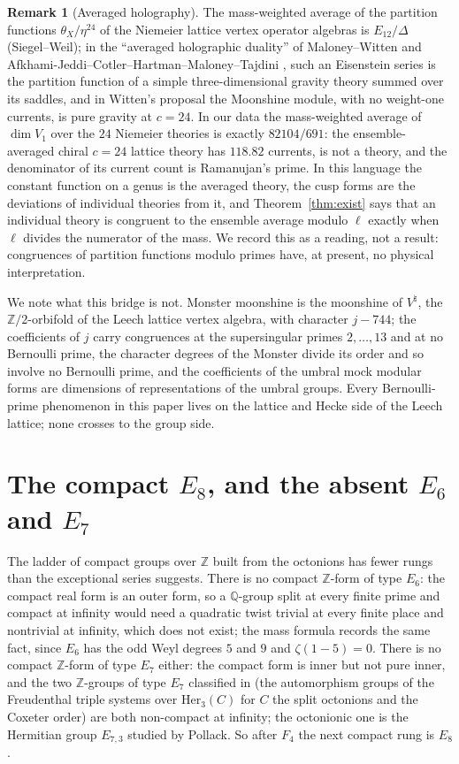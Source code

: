 \documentclass[11pt]{amsart}
\theoremstyle{definition}
\newtheorem{remark}[theorem]{Remark}
\newcommand{\Z}{\mathbb{Z}}\newcommand{\Q}{\mathbb{Q}}\newcommand{\R}{\mathbb{R}}\newcommand{\A}{\mathbb{A}}\newcommand{\F}{\mathbb{F}}
\begin{document}
\begin{remark}[Averaged holography]
The mass-weighted average of the partition functions $\theta_X/\eta^{24}$ of the Niemeier lattice vertex operator algebras is $E_{12}/\Delta$ (Siegel--Weil); in the ``averaged holographic duality'' of Maloney--Witten and Afkhami-Jeddi--Cotler--Hartman--Maloney--Tajdini \cite{MW,AJ}, such an Eisenstein series is the partition function of a simple three-dimensional gravity theory summed over its saddles, and in Witten's proposal \cite{Witten07} the Moonshine module, with no weight-one currents, is pure gravity at $c=24$. In our data the mass-weighted average of $\dim V_1$ over the $24$ Niemeier theories is exactly $82104/691$: the ensemble-averaged chiral $c=24$ lattice theory has $118.82$ currents, is not a theory, and the denominator of its current count is Ramanujan's prime. In this language the constant function on a genus is the averaged theory, the cusp forms are the deviations of individual theories from it, and Theorem~\ref{thm:exist} says that an individual theory is congruent to the ensemble average modulo $\ell$ exactly when $\ell$ divides the numerator of the mass. We record this as a reading, not a result: congruences of partition functions modulo primes have, at present, no physical interpretation.
\end{remark}

We note what this bridge is not. Monster moonshine is the moonshine of $V^\natural$, the $\Z/2$-orbifold of the Leech lattice vertex algebra, with character $j-744$; the coefficients of $j$ carry congruences at the supersingular primes $2,\dots,13$ and at no Bernoulli prime, the character degrees of the Monster divide its order and so involve no Bernoulli prime, and the coefficients of the umbral mock modular forms are dimensions of representations of the umbral groups. Every Bernoulli-prime phenomenon in this paper lives on the lattice and Hecke side of the Leech lattice; none crosses to the group side.


\section{The compact $E_8$, and the absent $E_6$ and $E_7$}\label{sec:e8}
The ladder of compact groups over $\Z$ built from the octonions has fewer rungs than the exceptional series suggests. There is no compact $\Z$-form of type $E_6$: the compact real form is an outer form, so a $\Q$-group split at every finite prime and compact at infinity would need a quadratic twist trivial at every finite place and nontrivial at infinity, which does not exist; the mass formula records the same fact, since $E_6$ has the odd Weyl degrees $5$ and $9$ and $\zeta(1-5)=0$. There is no compact $\Z$-form of type $E_7$ either: the compact form is inner but not pure inner, and the two $\Z$-groups of type $E_7$ classified in \cite{GPR} (the automorphism groups of the Freudenthal triple systems over $\mathrm{Her}_3(C)$ for $C$ the split octonions and the Coxeter order) are both non-compact at infinity; the octonionic one is the Hermitian group $E_{7,3}$ studied by Pollack. So after $F_4$ the next compact rung is $E_8$.
\end{document}
